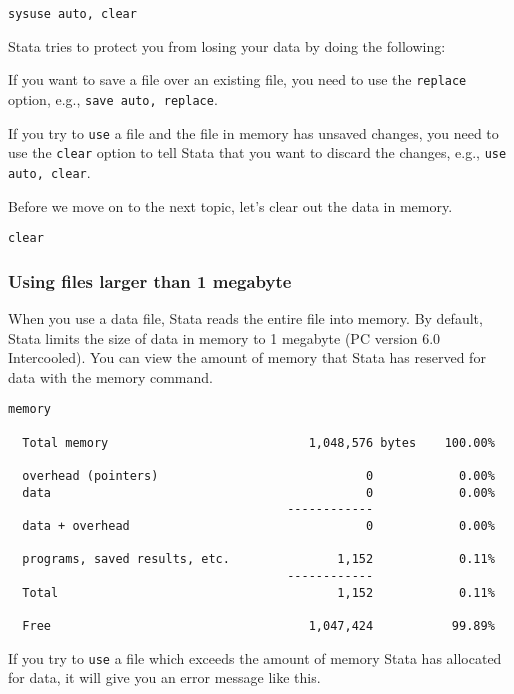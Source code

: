 \begin{lstlisting}
sysuse auto, clear
\end{lstlisting}

Stata tries to protect you from losing your data by doing the following:
\begin{compactenum}
\item If you want to save a file over an existing file, you need to use the \lstinline{replace} option, e.g., \lstinline{save auto, replace}.
\item If you try to \lstinline{use} a file and the file in memory has unsaved changes, you need to use the \lstinline{clear} option to tell Stata that you want to discard the changes, e.g., \lstinline{use auto, clear}.
\end{compactenum}

Before we move on to the next topic, let's clear out the data in memory.

\begin{lstlisting}
clear
\end{lstlisting}

\subsubsection{Using files larger than 1 megabyte}

When you use a data file, Stata reads the entire file into memory. By default, Stata limits the size of data in memory to 1 megabyte (PC version 6.0 Intercooled). You can view the amount of memory that Stata has reserved for data with the memory command.

\begin{lstlisting}
memory

  Total memory                            1,048,576 bytes    100.00%

  overhead (pointers)                             0            0.00%
  data                                            0            0.00%
                                       ------------
  data + overhead                                 0            0.00%

  programs, saved results, etc.               1,152            0.11%
                                       ------------
  Total                                       1,152            0.11%

  Free                                    1,047,424           99.89%
\end{lstlisting}

If you try to \lstinline{use} a file which exceeds the amount of memory Stata has allocated for data, it will give you an error message like this.

